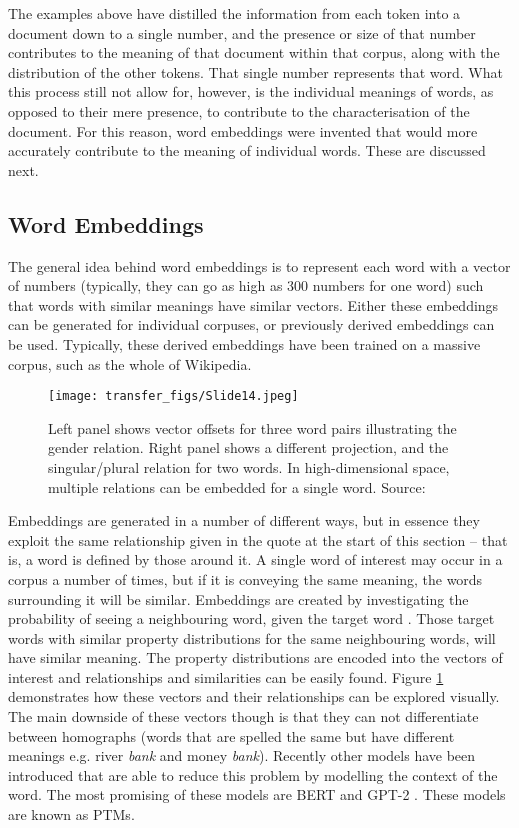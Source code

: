 The examples above have distilled the information from each token into a document down to a single number, and the presence or size of that number contributes to the meaning of that document within that corpus, along with the distribution of the other tokens. That single number represents that word. What this process still not allow for, however, is the individual meanings of words, as opposed to their mere presence, to contribute to the characterisation of the document. For this reason, word embeddings were invented that would more accurately contribute to the meaning of individual words. These are discussed next. 


\subsection{Word Embeddings}

The general idea behind word embeddings is to represent each word with a vector of numbers (typically, they can go as high as 300 numbers for one word) such that words with similar meanings have similar vectors. Either these embeddings can be generated for individual corpuses, or previously derived embeddings can be used. Typically, these derived embeddings have been trained on a massive corpus, such as the whole of Wikipedia.

\begin{figure}
  \texttt{[image: transfer\_figs/Slide14.jpeg]}
  \caption[Word Embeddings visual example]{Left panel shows vector offsets for three word pairs illustrating the gender relation. Right panel shows a different projection, and the singular/plural relation for two words. In high-dimensional space, multiple relations can be embedded for a single word. Source: \textcite{mikolov2013linguistic}}
  \label{fig:word}
\end{figure}

Embeddings are generated in a number of different ways, but in essence they exploit the same relationship given in the quote at the start of this section – that is, a word is defined by those around it. A single word of interest may occur in a corpus a number of times, but if it is conveying the same meaning, the words surrounding it will be similar. Embeddings are created by investigating the probability of seeing a neighbouring word, given the target word  \parencite{mikolov2013efficient}. Those target words with similar property distributions for the same neighbouring words, will have similar meaning. The property distributions are encoded into the vectors of interest and relationships and similarities can be easily found. Figure \ref{fig:word} demonstrates how these vectors and their relationships can be explored visually. The main downside of these vectors though is that they can not differentiate between homographs (words that are spelled the same but have different meanings e.g. river \emph{bank}  and money \emph{bank}). Recently other models have been introduced that are able to reduce this problem by modelling the context of the word. The most promising of these models are BERT \parencite{devlin2018bert} and GPT-2 \parencite{radford2019language}. These models are known as PTMs.



